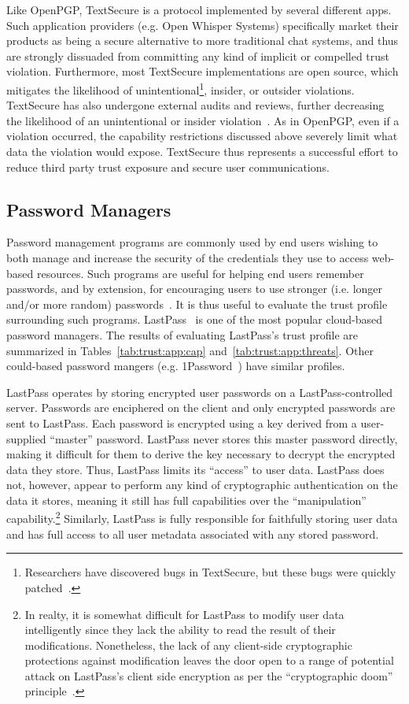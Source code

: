 Like OpenPGP, TextSecure is a protocol implemented by several
different apps. Such application providers (e.g. Open Whisper Systems)
specifically market their products as being a secure alternative to
more traditional chat systems, and thus are strongly dissuaded from
committing any kind of implicit or compelled trust
violation. Furthermore, most TextSecure implementations are open
source, which mitigates the likelihood of
unintentional\footnote{Researchers have discovered bugs in TextSecure,
  but these bugs were quickly patched~\cite{frosch2014}.}, insider, or
outsider violations. TextSecure has also undergone external audits and
reviews, further decreasing the likelihood of an unintentional or
insider violation~\cite{frosch2014}. As in OpenPGP, even if a
violation occurred, the capability restrictions discussed above
severely limit what data the violation would expose. TextSecure thus
represents a successful effort to reduce third party trust exposure
and secure user communications.

\subsection{Password Managers}

Password management programs are commonly used by end users wishing to
both manage and increase the security of the credentials they use to
access web-based resources. Such programs are useful for helping end
users remember passwords, and by extension, for encouraging users to
use stronger (i.e. longer and/or more random)
passwords~\cite{brodkin-passman, krebs-passwords,
  schneier-passwords}. It is thus useful to evaluate the trust profile
surrounding such programs. LastPass~\cite{lastpass} is one of the most
popular cloud-based password managers. The results of evaluating
LastPass's trust profile are summarized in
Tables~\ref{tab:trust:app:cap} and~\ref{tab:trust:app:threats}. Other
could-based password mangers (e.g. 1Password~\cite{onepassword}) have
similar profiles.

LastPass operates by storing encrypted user passwords on a
LastPass-controlled server. Passwords are enciphered on the client and
only encrypted passwords are sent to LastPass. Each password is
encrypted using a key derived from a user-supplied ``master''
password. LastPass never stores this master password directly, making
it difficult for them to derive the key necessary to decrypt the
encrypted data they store. Thus, LastPass limits its ``access'' to
user data. LastPass does not, however, appear to perform any kind of
cryptographic authentication on the data it stores, meaning it still
has full capabilities over the ``manipulation''
capability.\footnote{In realty, it is somewhat difficult for LastPass
  to modify user data intelligently since they lack the ability to
  read the result of their modifications. Nonetheless, the lack of any
  client-side cryptographic protections against modification leaves
  the door open to a range of potential attack on LastPass's client
  side encryption as per the ``cryptographic doom''
  principle~\cite{marlinspike-doom}.}  Similarly, LastPass is fully
responsible for faithfully storing user data and has full access to
all user metadata associated with any stored password.

